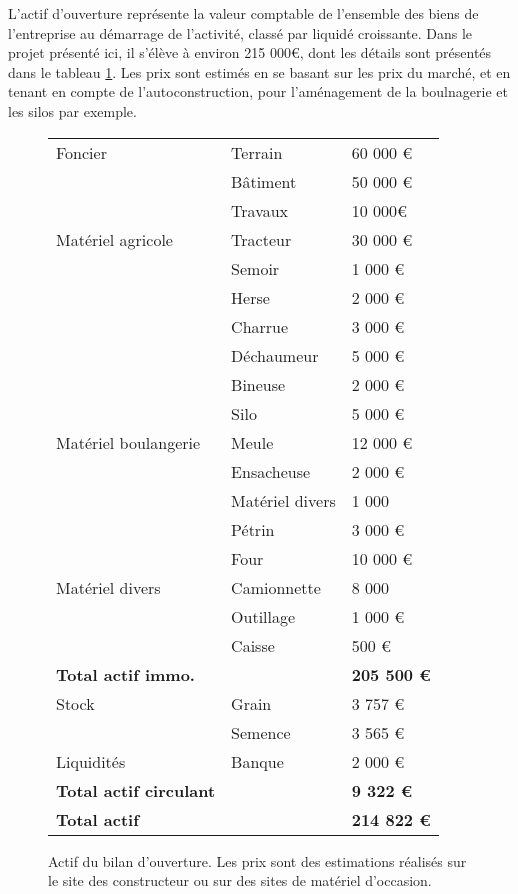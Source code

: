 \documentclass{book}
\begin{document}
L'actif d'ouverture représente la valeur comptable de l'ensemble des biens de l'entreprise au démarrage de l'activité, classé par liquidé croissante. Dans le projet présenté ici, il s'élève à environ 215 000\euro{}, dont les détails sont présentés dans le tableau \ref{tab:actif}. Les prix sont estimés en se basant sur les prix du marché, et en tenant en compte de l'autoconstruction, pour l'aménagement de la boulnagerie et les silos par exemple.

\begin{figure}[h!]
\footnotesize
\center
\begin{tabular}{ | p{3cm} | p{2cm}| p{2cm}| }

\hline
	Foncier & Terrain & 60 000 \euro{} \\ 
	 & Bâtiment & 50 000 \euro{} \\ 
	 & Travaux & 10 000\euro{} \\ \hline
	Matériel agricole & Tracteur & 30 000 \euro{} \\ 
	 & Semoir & 1 000 \euro{} \\ 
	 & Herse & 2 000 \euro{} \\ 
	 & Charrue & 3 000 \euro{}\\ 
	 & Déchaumeur & 5 000 \euro{}\\ 
	 & Bineuse & 2 000 \euro{}\\ 
	 & Silo & 5 000 \euro{}\\ \hline
	Matériel boulangerie & Meule & 12 000 \euro{}\\ 
	 & Ensacheuse & 2 000 \euro{}\\ 
	 & Matériel divers & 1 000  \\ 
	 & Pétrin & 3 000 \euro{}\\ 
	 & Four & 10 000 \euro{}\\ \hline
	Matériel divers & Camionnette & 8 000  \\ 
	 & Outillage & 1 000 \euro{}\\ 
	 & Caisse & 500 \euro{}\\ \hline
	\textbf{Total actif immo.} & &\textbf{205 500 \euro{}}  \\ \hline
	\hline
	Stock & Grain & 3 757 \euro{}\\ 
	 & Semence & 3 565 \euro{}\\ \hline
	Liquidités & Banque & 2 000 \euro{}\\ \hline
	\textbf{Total actif circulant} & & \textbf{9 322 \euro{}}  \\ \hline
	\hline
	\textbf{Total actif} & & \textbf{214 822 \euro{}}  \\ \hline

\end{tabular}
\caption{Actif du bilan d'ouverture. Les prix sont des estimations réalisés sur le site des constructeur ou sur des sites de matériel d'occasion.}
\label{tab:actif}
\end{figure}
\end{document}
